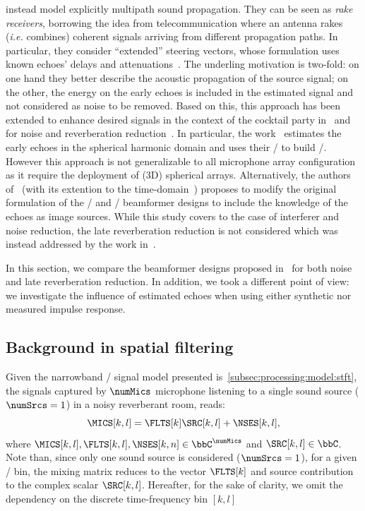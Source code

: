  instead model explicitly multipath sound propagation.
They can be seen as \textit{rake receivers}, borrowing the idea from telecommunication where an antenna rakes (\textit{i.e.} combines) coherent signals arriving from different propagation paths.
In particular, they consider ``extended'' steering vectors, whose formulation uses known echoes' delays and attenuations~.
The underling motivation is two-fold:
on one hand they better describe the acoustic propagation of the source signal; on the other, the energy on the early echoes is included in the estimated signal and not considered as noise to be removed.
Based on this, this approach has been extended to enhance desired signals in the context of the cocktail party in~ and for noise and reverberation reduction~.
In particular, the work~ estimates the early echoes in the spherical harmonic domain and uses their \DOAs/ to build \ReIR/.
However this approach is not generalizable to all microphone array configuration as it require the deployment of (3D) spherical arrays.
Alternatively, the authors of~ (with its extention to the time-domain~) proposes to modify the original formulation of the \DStxt/ and \MVDRtxt/ beamformer designs to include the knowledge of the echoes as image sources.
While this study covers to the case of interferer and noise reduction, the late reverberation reduction is not considered which was instead addressed by the work in~.

\mynewline
In this section, we compare the beamformer designs proposed in~ for both noise and late reverberation reduction.
In addition, we took a different point of view: we investigate the influence of estimated echoes when using either synthetic nor measured impulse response.

\subsection{Background in spatial filtering}
Given the narrowband \STFT/ signal model presented is~\cref{subsec:processing:model:stft}, the signals captured by $\numMics$ microphone listening to a single sound source ($\numSrcs=1$) in a noisy reverberant room, reads:
\begin{equation}
    \MICS[k,l] = \FLTS[k] \SRC[k, l]+ \NSES[k,l]
    ,
\end{equation}
where $\MICS[k,l], \FLTS[k,l], \NSES[k,n] \in \bbC^{\numMics}$ and $\SRC[k,l] \in \bbC$.
Note than, since only one sound source is considered ($\numSrcs=1$), for a given \TF/ bin, the mixing matrix reduces to the vector $\FLTS[k]$ and source contribution to the complex scalar $\SRC[k,l]$.
Hereafter, for the sake of clarity, we omit the dependency on the discrete time-frequency bin $[k,l]$

